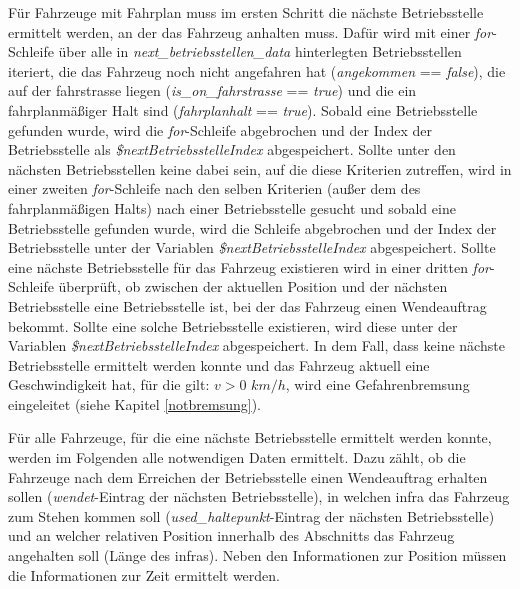Für Fahrzeuge mit Fahrplan muss im ersten Schritt die nächste Betriebsstelle ermittelt werden, an der das Fahrzeug anhalten muss. Dafür wird mit einer \textit{for}-Schleife über alle in \textit{next\_betriebsstellen\_data} hinterlegten Betriebsstellen iteriert, die das Fahrzeug noch nicht angefahren hat (\textit{angekommen} == \textit{false}), die auf der \Gls{fahrstrasse} liegen (\textit{is\_on\_fahrstrasse} == \textit{true}) und die ein fahrplanmäßiger Halt sind (\textit{fahrplanhalt} == \textit{true}). Sobald eine Betriebsstelle gefunden wurde, wird die \textit{for}-Schleife abgebrochen und der Index der Betriebsstelle als \textit{\$nextBetriebsstelleIndex} abgespeichert. Sollte unter den nächsten Betriebsstellen keine dabei sein, auf die diese Kriterien zutreffen, wird in einer zweiten \textit{for}-Schleife nach den selben Kriterien (außer dem des fahrplanmäßigen Halts) nach einer Betriebsstelle gesucht und sobald eine Betriebsstelle gefunden wurde, wird die Schleife abgebrochen und der Index der Betriebsstelle unter der Variablen \textit{\$nextBetriebsstelleIndex} abgespeichert. Sollte eine nächste Betriebsstelle für das Fahrzeug existieren wird in einer dritten \textit{for}-Schleife überprüft, ob zwischen der aktuellen Position und der nächsten Betriebsstelle eine Betriebsstelle ist, bei der das Fahrzeug einen Wendeauftrag bekommt. Sollte eine solche Betriebsstelle existieren, wird diese unter der Variablen \textit{\$nextBetriebsstelleIndex} abgespeichert. In dem Fall, dass keine nächste Betriebsstelle ermittelt werden konnte und das Fahrzeug aktuell eine Geschwindigkeit hat, für die gilt: $v>0$ $km/h$, wird eine Gefahrenbremsung eingeleitet (siehe Kapitel \ref{notbremsung}). 

Für alle Fahrzeuge, für die eine nächste Betriebsstelle ermittelt werden konnte, werden im Folgenden alle notwendigen Daten ermittelt. Dazu zählt, ob die Fahrzeuge nach dem Erreichen der Betriebsstelle einen Wendeauftrag erhalten sollen (\textit{wendet}-Eintrag der nächsten Betriebsstelle), in welchen \ac{infra} das Fahrzeug zum Stehen kommen soll (\textit{used\_haltepunkt}-Eintrag der nächsten Betriebsstelle) und an welcher relativen Position innerhalb des Abschnitts das Fahrzeug angehalten soll (Länge des \ac{infra}s). Neben den Informationen zur Position müssen die Informationen zur Zeit ermittelt werden. 

